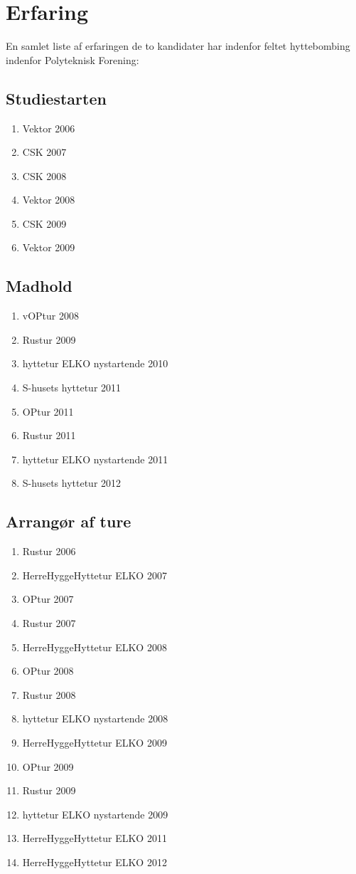 \section{Erfaring}
En samlet liste af erfaringen de to kandidater har indenfor feltet hyttebombing indenfor Polyteknisk Forening:

\subsection{Studiestarten}
\begin{enumerate}
\item Vektor 2006
\item CSK 2007
\item CSK 2008
\item Vektor 2008
\item CSK 2009
\item Vektor 2009
\end{enumerate}

\subsection{Madhold}
\begin{enumerate}
\item vOPtur 2008
\item Rustur 2009
\item hyttetur ELKO nystartende 2010
\item S-husets hyttetur 2011
\item OPtur 2011
\item Rustur 2011
\item hyttetur ELKO nystartende 2011
\item S-husets hyttetur 2012
\end{enumerate}


\subsection{Arrangør af ture}

\begin{enumerate}
\item Rustur 2006
\item HerreHyggeHyttetur ELKO 2007 
\item OPtur 2007
\item Rustur 2007
\item HerreHyggeHyttetur ELKO 2008
\item OPtur 2008
\item Rustur 2008
\item hyttetur ELKO nystartende 2008
\item HerreHyggeHyttetur ELKO 2009
\item OPtur 2009
\item Rustur 2009
\item hyttetur ELKO nystartende 2009
\item HerreHyggeHyttetur ELKO 2011
\item HerreHyggeHyttetur ELKO 2012
\end{enumerate}

